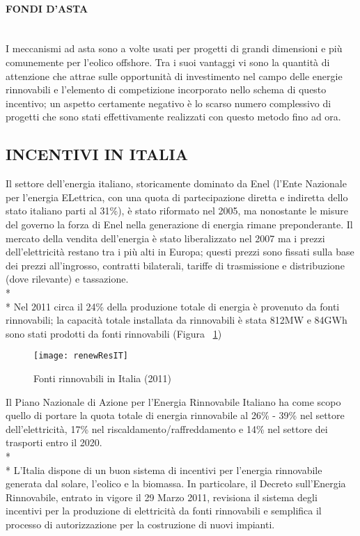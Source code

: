 \documentclass[12pt,a4paper,openright,twoside]{report}
\newcommand{\myparagraph}[1]{\paragraph{#1}\mbox{}\\}
\begin{document}
\myparagraph{FONDI D'ASTA}
I meccanismi ad asta sono a volte usati per progetti di grandi dimensioni e più comunemente per l'eolico offshore. Tra i suoi vantaggi vi sono la quantità di attenzione che attrae sulle opportunità di investimento nel campo delle energie rinnovabili e l'elemento di competizione incorporato nello schema di questo incentivo; un aspetto certamente negativo è lo scarso numero complessivo di progetti che sono stati effettivamente realizzati con questo metodo fino ad ora.


\subsection[INCENTIVI ITALIANI]{\nohyphens{INCENTIVI IN ITALIA}}
Il settore dell'energia italiano, storicamente dominato da Enel (l'Ente Nazionale per l'energia ELettrica, con una quota di partecipazione diretta e indiretta dello stato italiano parti al 31\%), è stato riformato nel 2005, ma nonostante le misure del governo la forza di Enel nella generazione di energia rimane preponderante. Il mercato della vendita dell'energia è stato liberalizzato nel 2007 ma i prezzi dell'elettricità restano tra i più alti in Europa; questi prezzi sono fissati sulla base dei prezzi all'ingrosso, contratti bilaterali, tariffe di trasmissione e distribuzione (dove rilevante) e tassazione.\\*\\*
Nel 2011 circa il 24\% della produzione totale di energia è provenuto da fonti rinnovabili; la capacità totale installata da rinnovabili è stata 812MW e 84GWh sono stati prodotti da fonti rinnovabili (Figura ~\ref{renewResIT}) 

\begin{figure}[hbt]
	\centering
	\texttt{[image: renewResIT]}
	\caption{Fonti rinnovabili in Italia (2011)}
	\label{renewResIT}
\end{figure}

Il Piano Nazionale di Azione per l'Energia Rinnovabile Italiano ha come scopo quello di portare la quota totale di energia rinnovabile al 26\% - 39\% nel settore dell'elettricità, 17\% nel riscaldamento/raffreddamento e 14\% nel settore dei trasporti entro il 2020.\\*\\*  
L'Italia dispone di un buon sistema di incentivi per l'energia rinnovabile generata dal solare, l'eolico e la biomassa. In particolare, il Decreto sull'Energia Rinnovabile, entrato in vigore il 29 Marzo 2011, revisiona il sistema degli incentivi per la produzione di elettricità da fonti rinnovabili e semplifica il processo di autorizzazione per la costruzione di nuovi impianti.  
\end{document}

